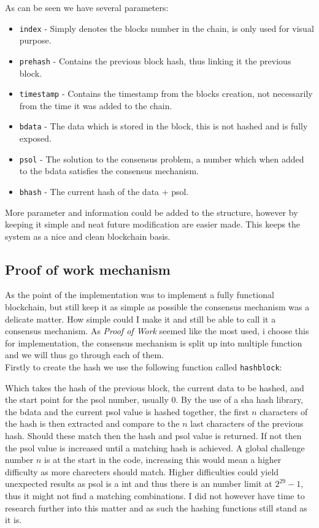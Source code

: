 \documentclass[paper=a4, fontsize=11pt]{scrartcl} %
\numberwithin{equation}{section} %
\numberwithin{figure}{section} %
\numberwithin{table}{section} %
\begin{document}
As can be seen we have several parameters:
\begin{itemize}
\item \texttt{index} - Simply denotes the blocks number in the chain, is only used for visual purpose. 
\item \texttt{prehash} - Contains the previous block hash, thus linking it the previous block. 
\item \texttt{timestamp} - Contains the timestamp from the blocks creation, not necessarily from the time it was added to the chain. 
\item \texttt{bdata} - The data which is stored in the block, this is not hashed and is fully exposed.
\item \texttt{psol} - The solution to the consensus problem, a number which when added to the bdata satisfies the consensus mechanism.
\item \texttt{bhash} - The current hash of the data + psol. 
\end{itemize}

More parameter and information could be added to the structure, however by keeping it simple and neat future modification are easier made. This keeps the system as a nice and clean blockchain basis.

\subsection{Proof of work mechanism}

As the point of the implementation was to implement a fully functional blockchain, but still keep it as simple as possible the consensus mechanism was a delicate matter. How simple could I make it and still be able to call it a consensus mechanism. As \textit{Proof of Work} seemed like the most used, i choose this for implementation, the consensus mechanism is split up into multiple function and we will thus go through each of them.\\

Firstly to create the hash we use the following function called \texttt{hashblock}: 



Which takes the hash of the previous block, the current data to be hashed, and the start point for the psol number, usually 0. By the use of a sha hash library, the bdata and the current psol value is hashed together, the first $n$ characters of the hash is then extracted and compare to the $n$ last characters of the previous hash. Should these match then the hash and psol value is returned. If not then the psol value is increased until a matching hash is achieved. A global challenge number $n$ is at the start in the code, increasing this would mean a higher difficulty as more charecters should match. Higher difficulties could yield unexpected results as psol is a int and thus there is an number limit at $2^{29}-1$, thus it might not find a matching combinations. I did not however have time to research further into this matter and as such the hashing functions still stand as it is.\\
\end{document}
